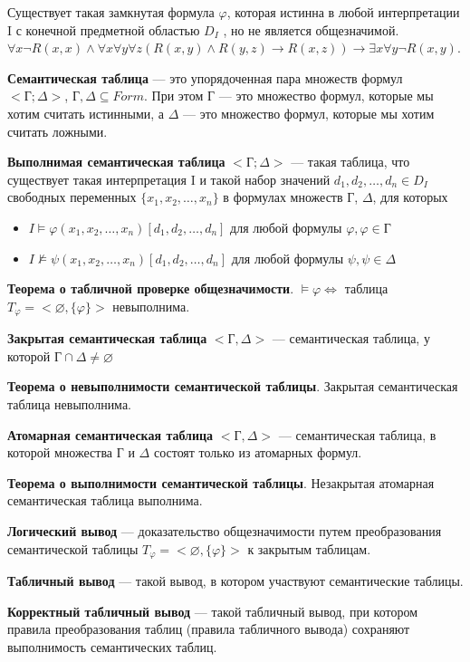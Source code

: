 \documentclass[a4paper,12pt]{article}
\begin{document}
Существует такая замкнутая формула $\varphi$, которая истинна в любой интерпретации I с конечной предметной областью $D_I$ , но не является общезначимой. $\forall x \neg R(x, x) \wedge \forall x \forall y \forall z(R(x,y) \wedge R(y,z) \rightarrow R(x,z)) \rightarrow \exists x \forall y \neg R(x,y)$.

\textbf{Семантическая таблица} --- это упорядоченная пара множеств формул $<\text{Г};\Delta>$, $\text{Г},\Delta \subseteq Form$. При этом Г --- это множество формул, которые мы хотим считать истинными, а $\Delta$ --- это множество формул, которые мы хотим считать ложными.

\textbf{Выполнимая семантическая таблица} $<\text{Г};\Delta>$ --- такая таблица, что существует такая интерпретация I и такой набор значений $d_1 , d_2 , \dots , d_n \in D_I$ свободных переменных $\{x_1, x_2, \dots, x_n\}$ в формулах множеств Г, $\Delta$, для которых
\begin{itemize}
 \item $I \models \varphi(x_1 , x_2 , \dots , x_n )[d_1 , d_2 , \dots , d_n ]$ для любой формулы $\varphi, \varphi \in \text{Г}$
 \item $I \nvDash \psi(x_1 , x_2 , \dots , x_n )[d_1 , d_2 , \dots , d_n ]$ для любой формулы $\psi, \psi \in \Delta$
\end{itemize}

\textbf{Теорема о табличной проверке общезначимости}. $\models \varphi \Leftrightarrow$ таблица $T_\varphi = <\varnothing, \{\varphi\}>$ невыполнима.

\textbf{Закрытая семантическая таблица} $<\text{Г}, \Delta>$ --- семантическая таблица, у которой $\text{Г} \cap \Delta \neq \varnothing$

\textbf{Теорема о невыполнимости семантической таблицы}. Закрытая семантическая таблица невыполнима.

\textbf{Атомарная семантическая таблица} $<\text{Г}, \Delta>$ --- семантическая таблица, в которой множества Г и $\Delta$ состоят только из атомарных формул.

\textbf{Теорема о выполнимости семантической таблицы}. Незакрытая атомарная семантическая таблица выполнима.

\textbf{Логический вывод} --- доказательство общезначимости путем преобразования семантической таблицы $T_\varphi = <\varnothing, \{\varphi\}>$ к закрытым таблицам.

\textbf{Табличный вывод} --- такой вывод, в котором участвуют семантические таблицы.

\textbf{Корректный табличный вывод} --- такой табличный вывод, при котором правила преобразования таблиц (правила табличного вывода) сохраняют выполнимость семантических таблиц.
\end{document}
